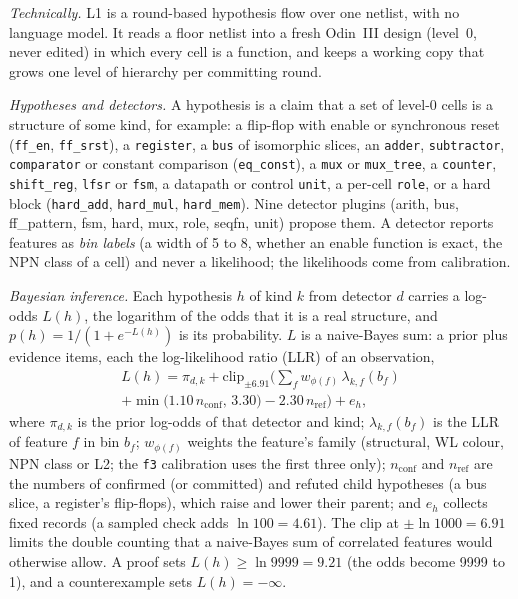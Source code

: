 \documentclass[conference]{IEEEtran}
\newcommand{\code}[1]{\texttt{#1}}
\begin{document}
\emph{Technically.} L1 is a round-based hypothesis flow over one netlist, with no language model. It reads a
floor netlist into a fresh Odin~III design (level~0, never edited) in which every cell is a
function, and keeps a working copy that grows one level of hierarchy per committing round.

\emph{Hypotheses and detectors.} A hypothesis is a claim that a set of level-0 cells is a
structure of some kind, for example: a flip-flop with enable or synchronous reset (\code{ff\_en},
\code{ff\_srst}), a \code{register}, a \code{bus} of isomorphic slices, an \code{adder},
\code{subtractor}, \code{comparator} or constant comparison (\code{eq\_const}), a
\code{mux} or \code{mux\_tree}, a \code{counter}, \code{shift\_reg}, \code{lfsr} or \code{fsm},
a datapath or control \code{unit}, a per-cell \code{role}, or a hard block
(\code{hard\_add}, \code{hard\_mul}, \code{hard\_mem}). Nine detector plugins (arith, bus,
ff\_pattern, fsm, hard, mux, role, seqfn, unit) propose them. A detector reports features as
\emph{bin labels} (a width of 5 to 8, whether an enable function is exact, the NPN class of a
cell) and never a likelihood; the likelihoods come from calibration.

\emph{Bayesian inference.}\label{sec:bayes} Each hypothesis $h$ of kind $k$ from detector
$d$ carries a log-odds $L(h)$, the logarithm of the odds that it is a real structure, and
$p(h)=1/(1+e^{-L(h)})$ is its probability. $L$ is a naive-Bayes sum: a prior plus evidence
items, each the log-likelihood ratio (LLR) of an observation,
\begin{multline}
L(h)=\pi_{d,k}+\mathrm{clip}_{\pm 6.91}\Big(\sum_{f} w_{\phi(f)}\,\lambda_{k,f}(b_f)\\
+\min\big(1.10\,n_{\mathrm{conf}},\,3.30\big)-2.30\,n_{\mathrm{ref}}\Big)+e_h,
\label{eq:logodds}
\end{multline}
where $\pi_{d,k}$ is the prior log-odds of that detector and kind; $\lambda_{k,f}(b_f)$ is the
LLR of feature $f$ in bin $b_f$; $w_{\phi(f)}$ weights the feature's family (structural, WL
colour, NPN class or L2; the \code{f3} calibration uses the first three only); $n_{\mathrm{conf}}$ and $n_{\mathrm{ref}}$ are the numbers of confirmed
(or committed) and refuted child hypotheses (a bus slice, a register's flip-flops), which raise
and lower their parent; and $e_h$ collects fixed records (a sampled check adds $\ln 100=4.61$).
The clip at $\pm\ln 1000=6.91$ limits the double counting that a naive-Bayes sum of
correlated features would otherwise allow. A proof sets $L(h)\ge\ln 9999=9.21$ (the odds
become 9999 to 1), and a counterexample sets $L(h)=-\infty$.
\end{document}
